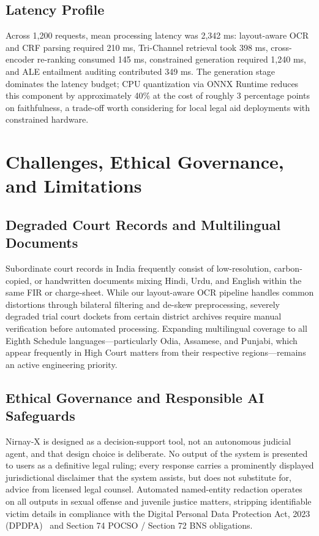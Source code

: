 \documentclass[conference]{IEEEtran}
\begin{document}
\subsection{Latency Profile}
Across 1,200 requests, mean processing latency was 2,342 ms: layout-aware OCR and CRF parsing required 210 ms, Tri-Channel retrieval took 398 ms, cross-encoder re-ranking consumed 145 ms, constrained generation required 1,240 ms, and ALE entailment auditing contributed 349 ms. The generation stage dominates the latency budget; CPU quantization via ONNX Runtime reduces this component by approximately 40\% at the cost of roughly 3 percentage points on faithfulness, a trade-off worth considering for local legal aid deployments with constrained hardware.

\section{Challenges, Ethical Governance, and Limitations}

\subsection{Degraded Court Records and Multilingual Documents}
Subordinate court records in India frequently consist of low-resolution, carbon-copied, or handwritten documents mixing Hindi, Urdu, and English within the same FIR or charge-sheet. While our layout-aware OCR pipeline handles common distortions through bilateral filtering and de-skew preprocessing, severely degraded trial court dockets from certain district archives require manual verification before automated processing. Expanding multilingual coverage to all Eighth Schedule languages---particularly Odia, Assamese, and Punjabi, which appear frequently in High Court matters from their respective regions---remains an active engineering priority.

\subsection{Ethical Governance and Responsible AI Safeguards}
Nirnay-X is designed as a decision-support tool, not an autonomous judicial agent, and that design choice is deliberate. No output of the system is presented to users as a definitive legal ruling; every response carries a prominently displayed jurisdictional disclaimer that the system assists, but does not substitute for, advice from licensed legal counsel. Automated named-entity redaction operates on all outputs in sexual offense and juvenile justice matters, stripping identifiable victim details in compliance with the Digital Personal Data Protection Act, 2023 (DPDPA)~\cite{dpdpa2023} and Section 74 POCSO / Section 72 BNS obligations.
\end{document}
